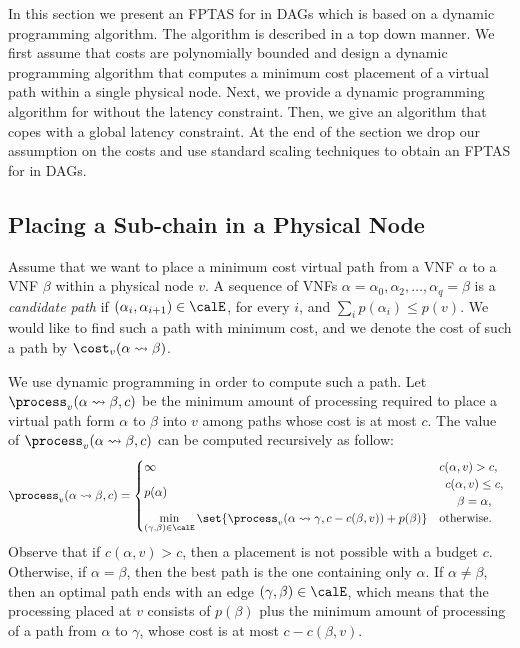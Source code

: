 In this section we present an FPTAS for \scp in DAGs which is based on
a dynamic programming algorithm.
%
The algorithm is described in a top down manner.  We first assume that
costs are polynomially bounded and design a dynamic programming
algorithm that computes a minimum cost placement of a virtual path
within a single physical node.  Next, we provide a dynamic programming
algorithm for \scp without the latency constraint.  Then, we give an
algorithm that copes with a global latency constraint.  At the end of
the section we drop our assumption on the costs and use standard
scaling techniques to obtain an FPTAS for \scp in DAGs.


\subsection{Placing a Sub-chain in a Physical Node}

Assume that we want to place a minimum cost virtual path from a VNF
$\alpha$ to a VNF $\beta$ within a physical node $v$.  A sequence of
VNFs $\alpha = \alpha_0,\alpha_2,\ldots,\alpha_q = \beta$ is a
\emph{candidate path} if $(\alpha_i,\alpha_{i+1}) \in \calE$, for
every $i$, and $\sum_i p(\alpha_i) \leq p(v)$.  We would like to find
such a path with minimum cost, and we denote the cost of such a path
by $\cost_v(\alpha \leadsto \beta)$.

We use dynamic programming in order to compute such a path.  Let
$\process_v(\alpha \leadsto \beta,c)$ be the minimum amount of
processing required to place a virtual path form $\alpha$ to $\beta$
into $v$ among paths whose cost is at most $c$.
%
The value of $\process_v(\alpha \leadsto \beta,c)$ can be computed
recursively as follow:
\[
\process_v(\alpha \leadsto \beta, c) =
\begin{cases}
\infty    & c(\alpha,v) > c, \\
p(\alpha) &
\begin{array}{c}
c(\alpha,v) \leq c, \\
\beta = \alpha,
\end{array}
\\
\displaystyle
\min_{(\gamma,\beta) \in \calE}
   \set{\process_v(\alpha \leadsto \gamma, c - c(\beta,v)) + p(\beta)}
          & \text{otherwise}.
\end{cases}
\]
Observe that if $c(\alpha,v) > c$, then a placement is not possible
with a budget $c$.  Otherwise, if $\alpha = \beta$, then the best path
is the one containing only $\alpha$.  If $\alpha \neq \beta$, then an
optimal path ends with an edge $(\gamma,\beta) \in \calE$, which means
that the processing placed at $v$ consists of $p(\beta)$ plus the
minimum amount of processing of a path from $\alpha$ to $\gamma$,
whose cost is at most $c - c(\beta,v)$.

